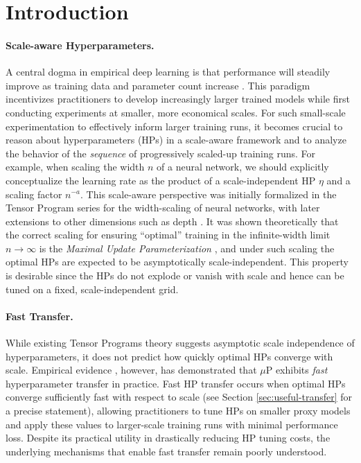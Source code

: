 \section{Introduction}


\paragraph{Scale-aware Hyperparameters.}
A central dogma in empirical deep learning is that performance will steadily improve as training data and parameter count increase \citep{hestness2017deep,kaplan2020scaling, hoffmann2022training}. This paradigm incentivizes practitioners to develop increasingly larger trained models while first conducting experiments at smaller, more economical scales. For such small-scale experimentation to effectively inform larger training runs, it becomes crucial to reason about hyperparameters (HPs) in a scale-aware framework and to analyze the behavior of the \textit{sequence} of progressively scaled-up training runs. 
For example, when scaling the width $n$ of a neural network, we should explicitly conceptualize the learning rate as the product of a scale-independent HP $\eta$ and a scaling factor $n^{-a}$. This scale-aware perspective was initially formalized in the Tensor Program series \citep{yang2021tensor, yang2022tensor, yang2023tensor} for the width-scaling of neural networks, with later extensions to other dimensions such as depth \citep{yang2023depth, bordelon2023depthwise, dey2025don, chizat2025hidden}. It was shown theoretically that the correct scaling for ensuring ``optimal'' training in the infinite-width limit $n\to\infty$ is the \textit{Maximal Update Parameterization} \citep[$\mu$P,][]{yang2021tensor}, and under such scaling the optimal HPs are expected to be asymptotically scale-independent. This property is desirable since the HPs do not explode or vanish with scale and hence can be tuned on a fixed, scale-independent grid.

\paragraph{Fast Transfer.} While existing Tensor Programs theory suggests asymptotic scale independence of hyperparameters, it does not predict how quickly optimal HPs converge with scale. Empirical evidence \citep{yang2022tensor, lingle2024empirical}, however, has demonstrated that $\mu$P exhibits \textit{fast} hyperparameter transfer in practice. Fast HP transfer occurs when optimal HPs converge sufficiently fast with respect to scale (see Section \ref{sec:useful-transfer} for a precise statement), allowing practitioners to tune HPs on smaller proxy models and apply these values to larger-scale training runs with minimal performance loss. Despite its practical utility in drastically reducing HP tuning costs, the underlying mechanisms that enable fast transfer remain poorly understood.


